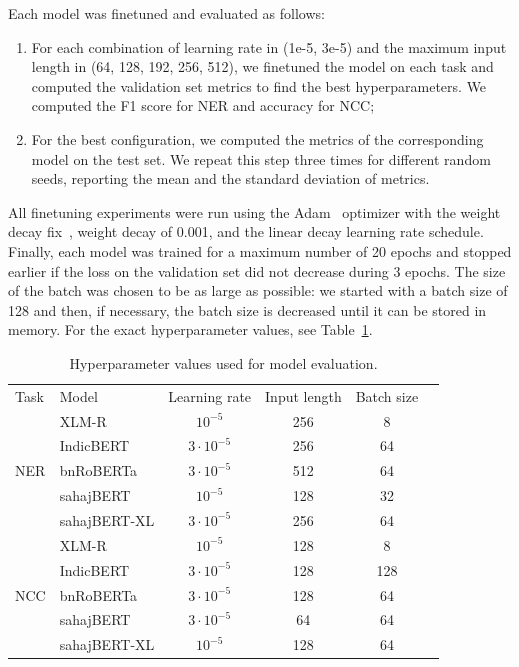 Each model was finetuned and evaluated as follows:
\begin{enumerate}[leftmargin=*]
    \item For each combination of learning rate in (1e-5, 3e-5) and the maximum input length in (64, 128, 192, 256, 512), we finetuned the model on each task and computed the validation set metrics to find the best hyperparameters. We computed the F1 score for NER and accuracy for NCC;
    \item For the best configuration, we computed the metrics of the corresponding model on the test set. We repeat this step three times for different random seeds, reporting the mean and the standard deviation of metrics.
\end{enumerate}
All finetuning experiments were run using the Adam~\cite{adam} optimizer with the weight decay fix~\cite{loshchilov2017decoupled}, weight decay of 0.001, and the linear decay learning rate schedule. Finally, each model was trained for a maximum number of 20 epochs and stopped earlier if the loss on the validation set did not decrease during 3 epochs. The size of the batch was chosen to be as large as possible: we started with a batch size of 128 and then, if necessary, the batch size is decreased until it can be stored in memory. For the exact hyperparameter values, see Table~\ref{tab:finetuned-model-hyperparams}.

\begin{table}[t]
\vspace{-16pt}
\caption{Hyperparameter values used for model evaluation.}
\label{tab:finetuned-model-hyperparams}
\centering
\vspace{6pt}
\begin{tabular}{llcccc}
\toprule
       Task     & Model  & Learning rate &  Input length & Batch size  \\
 \multirow{5}{*}{NER} 
 & XLM-R & $10^{-5}$ & 256 & 8 \\
 & IndicBERT & $3\cdot 10^{-5}$ & 256 & 64 \\
 & bnRoBERTa & $3\cdot 10^{-5}$ & 512 & 64 \\
 & sahajBERT & $10^{-5}$ & 128 & 32 \\
 & sahajBERT-XL & $3\cdot 10^{-5}$ & 256 & 64 \\
 \multirow{5}{*}{NCC}
 & XLM-R& $10^{-5}$ & 128 & 8 \\
 & IndicBERT & $3\cdot 10^{-5}$ & 128 & 128 \\
 & bnRoBERTa & $3\cdot 10^{-5}$ & 128 & 64 \\
 & sahajBERT & $3\cdot 10^{-5}$ & 64 & 64 \\
 & sahajBERT-XL & $10^{-5}$ & 128 & 64 \\
\bottomrule
\end{tabular}
\end{table}

